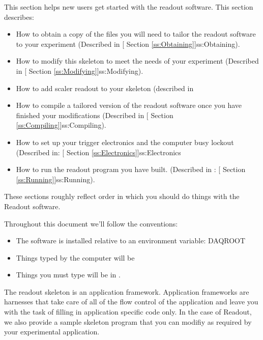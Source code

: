 
   This section helps new users get started with the
   readout software.  This section describes:
   \begin{itemize}
      \item How to obtain a copy of the files you will need
	    to tailor the readout software to your experiment
	    (Described in 
	    [
	       Section \ref{ss:Obtaining}]{ss:Obtaining}).
      \item How to modify this skeleton to meet the needs of
	    your experiment (Described in
	    [
	       Section \ref{ss:Modifying}]{ss:Modifying}).
      \item How to add scaler readout to your skeleton (described
	 in 
      \item How to compile a tailored version of the readout
	    software once you have finished your modifications
	    (Described in 
	    [
	       Section \ref{ss:Compiling}]{ss:Compiling}).
      \item How to set up your trigger electronics and 
	    the computer busy lockout (Described in:
	    [
	       Section \ref{ss:Electronics}]{ss:Electronics}
     \item How to run the readout program you have built.
	    (Described in :
	    [
	       Section \ref{ss:Running}]{ss:Running}).
 	    
   \end{itemize}

   These sections roughly reflect order in which you should
   do things with the Readout software.

   Throughout this document we'll follow the conventions:
   \begin{itemize}
      \item The software is installed relative to an
	 environment variable: DAQROOT
      \item Things typed by the computer will be 
      \item Things you must type will be in .
   \end{itemize}

   
   The readout skeleton is an application framework.  
   Application frameworks are harnesses that take care of all
   of the flow control of the application and leave you with 
   the task of filling in application specific code only.  
   In the case of Readout, we also provide a sample skeleton
   program that you can modifiy as required by your experimental
   application.
   
